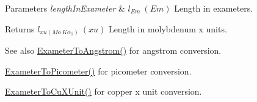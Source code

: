 \begin{DoxyParams}{Parameters}
{\em length\+In\+Exameter} & $ l_{Em}\ (Em)$ Length in exameters. \\
\hline
\end{DoxyParams}
\begin{DoxyReturn}{Returns}
$ l_{xu(Mo\ K\alpha_1)}\ (xu)$ Length in molybdenum x units. 
\end{DoxyReturn}
\begin{DoxySeeAlso}{See also}
\mbox{\hyperlink{group___e_g_x_math-_conversions-_length_conversions-_s_i-_exameter-_non-_s_i_ga24d2ee057470ce37f99d31451e010a22}{Exameter\+To\+Angstrom()}} for angstrom conversion. 

\mbox{\hyperlink{group___e_g_x_math-_conversions-_length_conversions-_s_i-_exameter-_s_i_gaf524e8324fedf2eb61d43ce1dc36bcac}{Exameter\+To\+Picometer()}} for picometer conversion. 

\mbox{\hyperlink{group___e_g_x_math-_conversions-_length_conversions-_s_i-_exameter-_non-_s_i_gacb2c9fea6b2c2d12ee485f378f5a6af0}{Exameter\+To\+Cu\+X\+Unit()}} for copper x unit conversion. 
\end{DoxySeeAlso}
